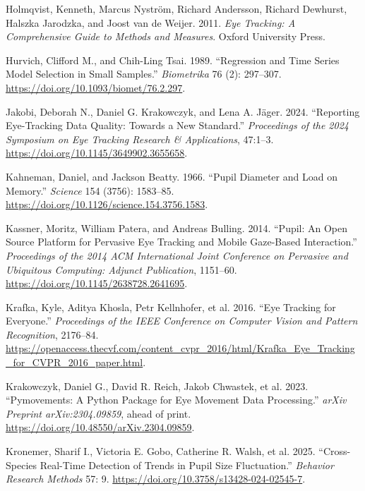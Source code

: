 \documentclass[
]{article}
\newlength{\cslhangindent}
\newenvironment{CSLReferences}[2] %
 {\begin{list}{}{%
  \setlength{\itemindent}{0pt}
  \setlength{\leftmargin}{0pt}
  \setlength{\parsep}{0pt}
  \ifodd #1
   \setlength{\leftmargin}{\cslhangindent}
   \setlength{\itemindent}{-1\cslhangindent}
  \fi
  \setlength{\itemsep}{#2\baselineskip}}}
 {\end{list}}
\begin{document}
\begin{CSLReferences}{1}{1}
Holmqvist, Kenneth, Marcus Nyström, Richard Andersson, Richard Dewhurst,
Halszka Jarodzka, and Joost van de Weijer. 2011. \emph{Eye Tracking: A
Comprehensive Guide to Methods and Measures}. Oxford University Press.

Hurvich, Clifford M., and Chih-Ling Tsai. 1989. {``Regression and Time
Series Model Selection in Small Samples.''} \emph{Biometrika} 76 (2):
297--307. \url{https://doi.org/10.1093/biomet/76.2.297}.

Jakobi, Deborah N., Daniel G. Krakowczyk, and Lena A. Jäger. 2024.
{``Reporting Eye-Tracking Data Quality: Towards a New Standard.''}
\emph{Proceedings of the 2024 Symposium on Eye Tracking Research \&
Applications}, 47:1--3. \url{https://doi.org/10.1145/3649902.3655658}.

Kahneman, Daniel, and Jackson Beatty. 1966. {``Pupil Diameter and Load
on Memory.''} \emph{Science} 154 (3756): 1583--85.
\url{https://doi.org/10.1126/science.154.3756.1583}.

Kassner, Moritz, William Patera, and Andreas Bulling. 2014. {``Pupil: An
Open Source Platform for Pervasive Eye Tracking and Mobile Gaze-Based
Interaction.''} \emph{Proceedings of the 2014 ACM International Joint
Conference on Pervasive and Ubiquitous Computing: Adjunct Publication},
1151--60. \url{https://doi.org/10.1145/2638728.2641695}.

Krafka, Kyle, Aditya Khosla, Petr Kellnhofer, et al. 2016. {``Eye
Tracking for Everyone.''} \emph{Proceedings of the IEEE Conference on
Computer Vision and Pattern Recognition}, 2176--84.
\url{https://openaccess.thecvf.com/content_cvpr_2016/html/Krafka_Eye_Tracking_for_CVPR_2016_paper.html}.

Krakowczyk, Daniel G., David R. Reich, Jakob Chwastek, et al. 2023.
{``Pymovements: A Python Package for Eye Movement Data Processing.''}
\emph{arXiv Preprint arXiv:2304.09859}, ahead of print.
\url{https://doi.org/10.48550/arXiv.2304.09859}.

Kronemer, Sharif I., Victoria E. Gobo, Catherine R. Walsh, et al. 2025.
{``Cross-Species Real-Time Detection of Trends in Pupil Size
Fluctuation.''} \emph{Behavior Research Methods} 57: 9.
\url{https://doi.org/10.3758/s13428-024-02545-7}.


\end{CSLReferences}
\end{document}
